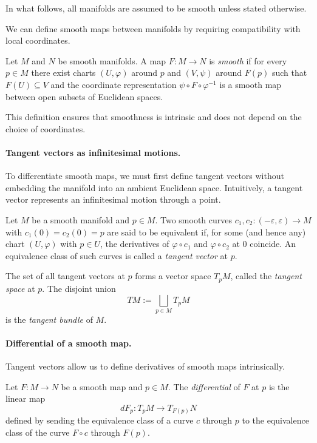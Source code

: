In what follows, all manifolds are assumed to be smooth unless stated otherwise.

We can define smooth maps between manifolds by requiring compatibility with local coordinates.

\begin{gdefn}
Let $M$ and $N$ be smooth manifolds.
A map $F:M\to N$ is \emph{smooth} if for every $p\in M$ there exist charts
$(U,\varphi)$ around $p$ and $(V,\psi)$ around $F(p)$ such that
$F(U)\subseteq V$ and the coordinate representation
$\psi\circ F\circ \varphi^{-1}$ is a smooth map between open subsets of Euclidean spaces.
\end{gdefn}

This definition ensures that smoothness is intrinsic and does not depend on the choice of
coordinates.

\paragraph{Tangent vectors as infinitesimal motions.}
To differentiate smooth maps, we must first define tangent vectors without embedding the
manifold into an ambient Euclidean space.
Intuitively, a tangent vector represents an infinitesimal motion through a point.

\begin{gdefn}
Let $M$ be a smooth manifold and $p\in M$.
Two smooth curves
$c_1,c_2:(-\varepsilon,\varepsilon)\to M$ with $c_1(0)=c_2(0)=p$ are said to be equivalent
if, for some (and hence any) chart $(U,\varphi)$ with $p\in U$,
the derivatives of $\varphi\circ c_1$ and $\varphi\circ c_2$ at $0$ coincide.
An equivalence class of such curves is called a \emph{tangent vector} at $p$.

The set of all tangent vectors at $p$ forms a vector space $T_pM$, called the
\emph{tangent space} at $p$.
The disjoint union
\[
TM := \bigsqcup_{p\in M} T_pM
\]
is the \emph{tangent bundle} of $M$.
\end{gdefn}

\paragraph{Differential of a smooth map.}
Tangent vectors allow us to define derivatives of smooth maps intrinsically.

\begin{gdefn}[Differential]
Let $F:M\to N$ be a smooth map and $p\in M$.
The \emph{differential} of $F$ at $p$ is the linear map
\[
dF_p : T_pM \to T_{F(p)}N
\]
defined by sending the equivalence class of a curve $c$ through $p$ to the equivalence
class of the curve $F\circ c$ through $F(p)$.
\end{gdefn}

